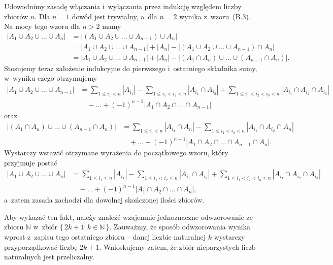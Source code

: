 \exercise %
Udowodnimy zasadę włączania i~wyłączania przez indukcję względem liczby zbiorów $n$. Dla $n=1$ dowód jest trywialny, a~dla $n=2$ wynika z~wzoru~(B.3). Na mocy tego wzoru dla $n>2$ mamy
\begin{align*}
    |A_1\cup A_2\cup\dots\cup A_n| &= \bigl|(A_1\cup A_2\cup\dots\cup A_{n-1})\cup A_n\bigr| \\
	&= |A_1\cup A_2\cup\dots\cup A_{n-1}|+|A_n|-\bigl|(A_1\cup A_2\cup\dots\cup A_{n-1})\cap A_n\bigr| \\
	&= |A_1\cup A_2\cup\dots\cup A_{n-1}|+|A_n|-\bigl|(A_1\cap A_n)\cup\dots\cup(A_{n-1}\cap A_n)\bigr|.
\end{align*}
Stosujemy teraz założenie indukcyjne do pierwszego i~ostatniego składnika sumy, w~wyniku czego otrzymujemy
\begin{align*}
	|A_1\cup A_2\cup\dots\cup A_{n-1}| &= \sum_{1\le i_1<n}|A_{i_1}|-\sum_{1\le i_1<i_2<n}|A_{i_1}\cap A_{i_2}|+\sum_{1\le i_1<i_2<i_3<n}|A_{i_1}\cap A_{i_2}\cap A_{i_3}| \\[1mm]
	&\quad {}-\dots+(-1)^{n-2}|A_1\cap A_2\cap\dots\cap A_{n-1}|
\end{align*}
oraz
\begin{align*}
	\bigl|(A_1\cap A_n)\cup\dots\cup(A_{n-1}\cap A_n)\bigr| &= \sum_{1\le i_1<n}|A_{i_1}\cap A_n|-\sum_{1\le i_1<i_2<n}|A_{i_1}\cap A_{i_2}\cap A_n|\\[1mm]
	&\quad {}+\dots+(-1)^{n-1}|A_1\cap A_2\cap\dots\cap A_{n-1}\cap A_n|.
\end{align*}
Wystarczy wstawić otrzymane wyrażenia do początkowego wzoru, który przyjmuje postać
\begin{align*}
	|A_1\cup A_2\cup\dots\cup A_n| &= \sum_{1\le i_1\le n}|A_{i_1}|-\sum_{1\le i_1<i_2\le n}|A_{i_1}\cap A_{i_2}|+\sum_{1\le i_1<i_2<i_3\le n}|A_{i_1}\cap A_{i_2}\cap A_{i_3}| \\[1mm]
	&\quad {}-\dots+(-1)^{n-1}|A_1\cap A_2\cap\dots\cap A_n|,
\end{align*}
a~zatem zasada zachodzi dla dowolnej skończonej ilości zbiorów.

\exercise %

\noindent Aby wykazać ten fakt, należy znaleźć wzajemnie jednoznaczne odwzorowanie ze zbioru $\mathbb{N}$ w~zbiór $\bigl\{\,2k+1:k\in\mathbb{N}\,\bigr\}$. Zauważmy, że sposób odwzorowania wynika wprost z~zapisu tego ostatniego zbioru -- danej liczbie naturalnej $k$ wystarczy przyporządkować liczbę $2k+1$. Wnioskujemy zatem, że zbiór nieparzystych liczb naturalnych jest przeliczalny.

